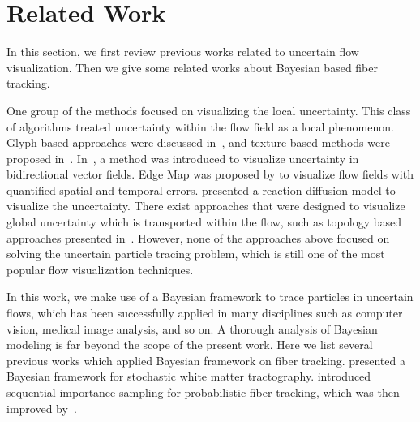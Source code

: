 \section{Related Work}

In this section, we first review previous works related to uncertain flow visualization. Then we give some related works about Bayesian based fiber tracking.

One group of the methods focused on visualizing the local uncertainty. This class of algorithms treated uncertainty within the flow field as a local phenomenon. Glyph-based approaches were discussed in~\cite{conf/visualization/LodhaPSW96, citeulike:4002316}, and texture-based methods were proposed in~\cite{10.1109/VIS.2005.97, botchen:2006:IVUF}. In~\cite{zuk:2008:UBVF}, a method was introduced to visualize uncertainty in bidirectional vector fields. Edge Map was proposed by \cite{10.1109/TVCG.2011.265} to visualize flow fields with quantified spatial and temporal errors. \cite{conf/visualization/SandersonJK04} presented a reaction-diffusion model to visualize the uncertainty. There exist approaches that were designed to visualize global uncertainty which is transported within the flow, such as topology based approaches presented in~\cite{Otto10a, Otto11a}. However, none of the approaches above focused on solving the uncertain particle tracing problem, which is still one of the most popular flow visualization techniques.

In this work, we make use of a Bayesian framework to trace particles in uncertain flows, which has been successfully applied in many disciplines such as computer vision, medical image analysis, and so on. A thorough analysis of Bayesian modeling is far beyond the scope of the present work. Here we list several previous works which applied Bayesian framework on fiber tracking. \cite{frimanTMI06} presented a Bayesian framework for stochastic white matter tractography. \cite{bjornemoMICCAI02, Brun02whitematter} introduced sequential importance sampling for probabilistic fiber tracking, which was then improved by~\cite{journals/mia/PontabryROSKD13, Zhang20095}.
